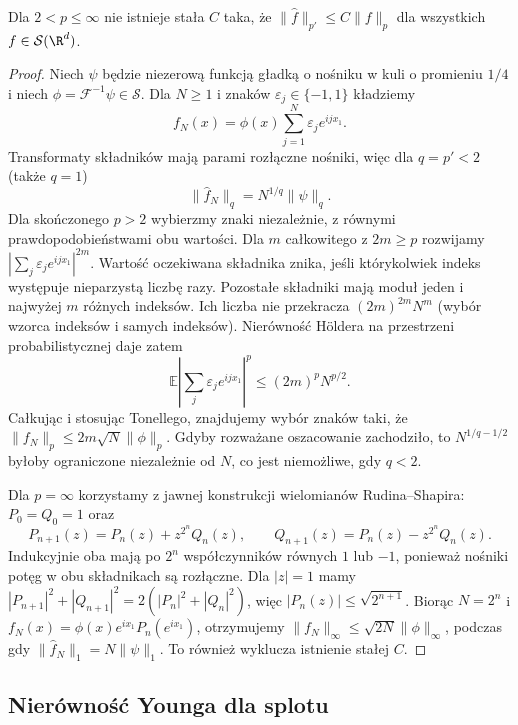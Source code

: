 \begin{stwierdzenie}
\label{prop:dt-hy-fails}
Dla $2<p\le\infty$ nie istnieje stała $C$ taka, że
$\|\widehat f\|_{p'}\le C\|f\|_p$ dla wszystkich
$f\in\mathcal S(\R^d)$.
\end{stwierdzenie}
\begin{proof}
Niech $\psi$ będzie niezerową funkcją gładką
o nośniku w kuli o promieniu $1/4$ i niech
$\phi=\mathcal F^{-1}\psi\in\mathcal S$.
Dla $N\ge1$ i znaków $\varepsilon_j\in\{-1,1\}$
kładziemy
\[
 f_N(x)=\phi(x)\sum_{j=1}^N\varepsilon_j e^{ijx_1}.
\]
Transformaty składników mają parami rozłączne nośniki,
więc dla $q=p'<2$ (także $q=1$)
\[
 \|\widehat f_N\|_q=N^{1/q}\|\psi\|_q.
\]
Dla skończonego $p>2$ wybierzmy znaki niezależnie,
z równymi prawdopodobieństwami obu wartości.
Dla $m$ całkowitego z $2m\ge p$ rozwijamy
$\left|\sum_j\varepsilon_j e^{ijx_1}\right|^{2m}$.
Wartość oczekiwana składnika znika, jeśli którykolwiek
indeks występuje nieparzystą liczbę razy. Pozostałe
składniki mają moduł jeden i najwyżej $m$ różnych
indeksów. Ich liczba nie przekracza
$(2m)^{2m}N^m$ (wybór wzorca indeksów i samych indeksów).
Nierówność Höldera na przestrzeni probabilistycznej daje
zatem
\[
 \mathbb E\left|\sum_j\varepsilon_j e^{ijx_1}\right|^p
 \le (2m)^p N^{p/2}.
\]
Całkując i stosując Tonellego, znajdujemy wybór znaków
taki, że $\|f_N\|_p\le 2m\sqrt N\|\phi\|_p$.
Gdyby rozważane oszacowanie zachodziło, to
$N^{1/q-1/2}$ byłoby ograniczone niezależnie od $N$,
co jest niemożliwe, gdy $q<2$.

Dla $p=\infty$ korzystamy z jawnej konstrukcji
wielomianów Rudina--Shapira:
$P_0=Q_0=1$ oraz
\[
 P_{n+1}(z)=P_n(z)+z^{2^n}Q_n(z),\qquad
 Q_{n+1}(z)=P_n(z)-z^{2^n}Q_n(z).
\]
Indukcyjnie oba mają po $2^n$ współczynników
równych $1$ lub $-1$, ponieważ nośniki potęg
w obu składnikach są rozłączne. Dla $|z|=1$ mamy
$|P_{n+1}|^2+|Q_{n+1}|^2=2(|P_n|^2+|Q_n|^2)$,
więc $|P_n(z)|\le\sqrt{2^{n+1}}$.
Biorąc $N=2^n$ i $f_N(x)=\phi(x)e^{ix_1}P_n(e^{ix_1})$,
otrzymujemy $\|f_N\|_\infty\le\sqrt{2N}\|\phi\|_\infty$,
podczas gdy $\|\widehat f_N\|_1=N\|\psi\|_1$.
To również wyklucza istnienie stałej $C$.
\end{proof}

\subsection{Nierówność Younga dla splotu}

